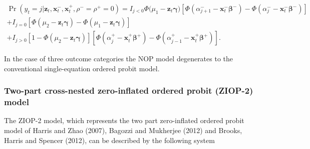 \documentclass[letterpaper,fleqn,12pt]{article}
\begin{document}
\begin{onehalfspace}
\begin{center}
$%
\begin{array}{l}
\Pr (y_{t}=j|\mathbf{z}_{t},\mathbf{x}_{t}^{-},\mathbf{x}_{t}^{+},\rho
^{-}=\rho ^{+}=0)=I_{j<0}\Phi (\mu _{1}-\mathbf{z}_{t}\mathbf{\gamma )}[\Phi
(\alpha _{j+1}^{-}-\mathbf{x}_{t}^{-}\mathbf{\beta }^{-})-\Phi (\alpha
_{j}^{-}-\mathbf{x}_{t}^{-}\mathbf{\beta }^{-})] \\ 
+I_{j=0}[\Phi (\mu _{2}-\mathbf{z}_{t}\mathbf{\gamma })-\Phi (\mu _{1}-%
\mathbf{z}_{t}\mathbf{\gamma })] \\ 
+I_{j>0}[1-\Phi (\mu _{2}-\mathbf{z}_{t}\mathbf{\gamma })][\Phi (\alpha
_{j}^{+}-\mathbf{x}_{t}^{+}\mathbf{\beta }^{+})-\Phi (\alpha _{j-1}^{+}-%
\mathbf{x}_{t}^{+}\mathbf{\beta }^{+})]\text{.}%
\end{array}%
$
\end{center}

In the case of three outcome categories the NOP model degenerates to the
conventional single-equation ordered probit model.

\subsubsection*{Two-part cross-nested zero-inflated ordered probit (ZIOP-2)
model}

The ZIOP-2 model, which represents the two part zero-inflated ordered probit
model of Harris and Zhao (2007), Bagozzi and Mukherjee (2012) and Brooks,
Harris and Spencer (2012), can be described by the following system

\medskip


\end{onehalfspace}
\end{document}
